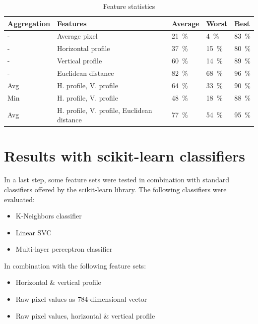 \documentclass[a4paper]{scrreprt}
\begin{document}
\begin{table}
		\begin{tabular}{lllll}
				\toprule
				Aggregation & Features & Average & Worst & Best \\
				\midrule
				- & Average pixel & \SI{21}{\percent} & \SI{4}{\percent} & \SI{83}{\percent} \\
				- & Horizontal profile & \SI{37}{\percent} & \SI{15}{\percent} & \SI{80}{\percent} \\
				- & Vertical profile & \SI{60}{\percent} & \SI{14}{\percent} & \SI{89}{\percent} \\
				- & Euclidean distance & \SI{82}{\percent} & \SI{68}{\percent} & \SI{96}{\percent} \\
				Avg & H. profile, V. profile & \SI{64}{\percent} & \SI{33}{\percent} & \SI{90}{\percent} \\
				Min & H. profile, V. profile & \SI{48}{\percent} & \SI{18}{\percent} & \SI{88}{\percent} \\
				Avg & H. profile, V. profile, Euclidean distance & \SI{77}{\percent} & \SI{54}{\percent} & \SI{95}{\percent} \\
				\bottomrule
		\end{tabular}
		\label{tbl:evaluation}
		\caption{Feature statistics}
\end{table}

\section{Results with scikit-learn classifiers}

In a last step, some feature sets were tested in combination with standard
classifiers offered by the scikit-learn library. The following classifiers were
evaluated:

\begin{itemize}
		\item K-Neighbors classifier
		\item Linear SVC
		\item Multi-layer perceptron classifier
\end{itemize}

In combination with the following feature sets:

\begin{itemize}
		\item Horizontal \& vertical profile
		\item Raw pixel values as $784$-dimensional vector
		\item Raw pixel values, horizontal \& vertical profile
\end{itemize}
\end{document}
